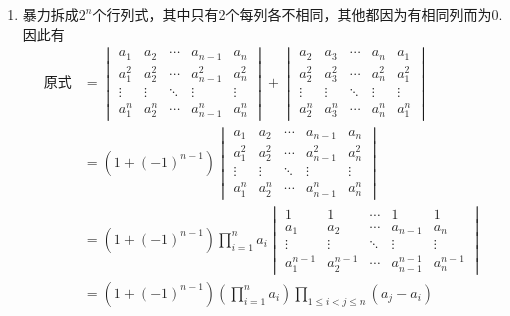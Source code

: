 \begin{enumerate}
    \item 暴力拆成$2^n$个行列式，其中只有2个每列各不相同，其他都因为有相同列而为0. 因此有
          \begin{align*}
              \text{原式} & =\begin{vmatrix}
                                 a_{1}     & a_{2}     & \cdots & a_{n-1}     & a_{n}     \\
                                 a_{1}^{2} & a_{2}^{2} & \cdots & a_{n-1}^{2} & a_{n}^{2} \\
                                 \vdots    & \vdots    & \ddots & \vdots      & \vdots    \\
                                 a_{1}^{n} & a_{2}^{n} & \cdots & a_{n-1}^{n} & a_{n}^{n}
                             \end{vmatrix}+
              \begin{vmatrix}
                  a_{2}     & a_{3}     & \cdots & a_{n}     & a_{1}     \\
                  a_{2}^{2} & a_{3}^{2} & \cdots & a_{n}^{2} & a_{1}^{2} \\
                  \vdots    & \vdots    & \ddots & \vdots    & \vdots    \\
                  a_{2}^{n} & a_{3}^{n} & \cdots & a_{n}^{n} & a_{1}^{n}
              \end{vmatrix}                                \\
                          & =(1+(-1)^{n-1})\begin{vmatrix}
                                               a_{1}     & a_{2}     & \cdots & a_{n-1}     & a_{n}     \\
                                               a_{1}^{2} & a_{2}^{2} & \cdots & a_{n-1}^{2} & a_{n}^{2} \\
                                               \vdots    & \vdots    & \ddots & \vdots      & \vdots    \\
                                               a_{1}^{n} & a_{2}^{n} & \cdots & a_{n-1}^{n} & a_{n}^{n}
                                           \end{vmatrix} \\
                          & =(1+(-1)^{n-1})\prod_{i=1}^na_i
              \begin{vmatrix}
                  1           & 1           & \cdots & 1             & 1           \\
                  a_{1}       & a_{2}       & \cdots & a_{n-1}       & a_{n}       \\
                  \vdots      & \vdots      & \ddots & \vdots        & \vdots      \\
                  a_{1}^{n-1} & a_{2}^{n-1} & \cdots & a_{n-1}^{n-1} & a_{n}^{n-1}
              \end{vmatrix}                      \\
                          & =(1+(-1)^{n-1})\left(\prod_{i=1}^na_i\right)\prod_{1\leqslant i<j\leqslant n}(a_j-a_i)      \\
          \end{align*}


\end{enumerate}
